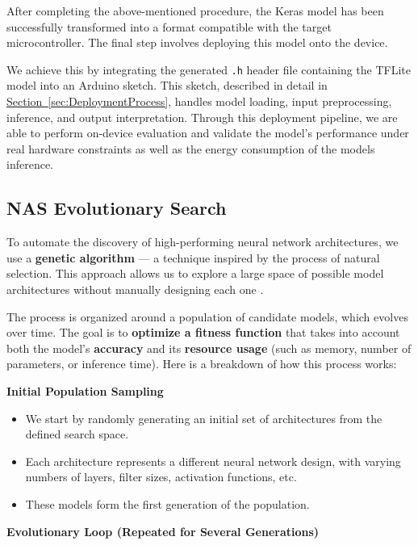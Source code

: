 After completing the above-mentioned procedure, the Keras model has been successfully transformed into a format compatible with the target microcontroller. The final step involves deploying this model onto the device.

We achieve this by integrating the generated \texttt{.h} header file containing the TFLite model into an Arduino sketch. This sketch, described in detail in \hyperref[sec:DeploymentProcess]{Section~\ref*{sec:DeploymentProcess}}, handles model loading, input preprocessing, inference, and output interpretation. Through this deployment pipeline, we are able to perform on-device evaluation and validate the model's performance under real hardware constraints as well as the energy consumption of the models inference.



\subsection{NAS Evolutionary Search}

To automate the discovery of high-performing neural network architectures, we use a \textbf{genetic algorithm} — a technique inspired by the process of natural selection. This approach allows us to explore a large space of possible model architectures without manually designing each one \cite{real2019regularized}.

The process is organized around a population of candidate models, which evolves over time. The goal is to \textbf{optimize a fitness function} that takes into account both the model’s \textbf{accuracy} and its \textbf{resource usage} (such as memory, number of parameters, or inference time).
Here is a breakdown of how this process works:

\textbf{Initial Population Sampling}
\begin{itemize}
    \item We start by randomly generating an initial set of architectures from the defined search space.
    \item Each architecture represents a different neural network design, with varying numbers of layers, filter sizes, activation functions, etc.
    \item These models form the first generation of the population.


\end{itemize}

\textbf{Evolutionary Loop (Repeated for Several Generations)}

